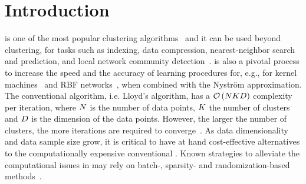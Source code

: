 \section{Introduction}

\kmeans is one of the most popular clustering algorithms~\cite{hartigan1979algorithm,jain2010data} and it can be used beyond clustering, for tasks such as indexing, data compression,  nearest-neighbor search and prediction, and local network community detection~\cite{muja2014scalable,van2016local}. \kmeans is also a pivotal process to increase the speed and the accuracy of learning procedures for, e.g.,  for kernel machines~\cite{si2016computationally} and RBF networks~\cite{que2016back}, when combined with the Nyström approximation.
%
The  conventional  \kmeans  algorithm, i.e.  Lloyd's algorithm, has  a $\mathcal{O}\left(NKD\right)$  complexity  per iteration, where $N$ is the number of data points, $K$ the number of clusters and $D$ is the dimension of the data points.
However, the larger the number of clusters, the more iterations are required to converge~\cite{arthur2006slow}.
%
As data dimensionality and data sample size grow, it is critical to have at hand cost-effective 
alternatives to the computationally expensive conventional \kmeans. 
Known strategies to alleviate the computational issues in \kmeans may rely on batch-, sparsity- and randomization-based methods~\cite{Sculley2010Web,boutsidis2014randomized,shen2017compressed,liu2017sparse}.

